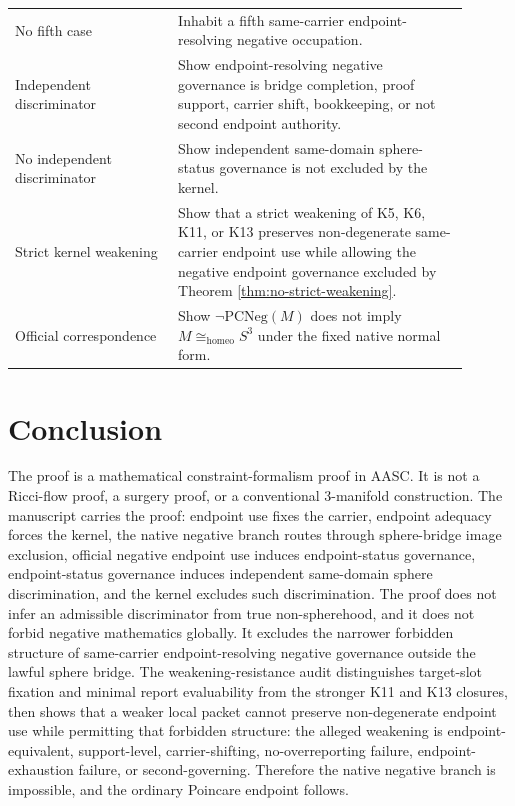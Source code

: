 \documentclass[11pt]{article}
\newcommand{\Sthree}{S^{3}}
\newcommand{\PCNeg}{\mathrm{PCNeg}}
\newcommand{\Homeo}{\cong_{\mathrm{homeo}}}
\begin{document}
\begin{longtable}{L{0.32\linewidth}L{0.58\linewidth}}
No fifth case & Inhabit a fifth same-carrier endpoint-resolving negative occupation.\\
Independent discriminator & Show endpoint-resolving negative governance is bridge completion, proof support, carrier shift, bookkeeping, or not second endpoint authority.\\
No independent discriminator & Show independent same-domain sphere-status governance is not excluded by the kernel.\\
Strict kernel weakening & Show that a strict weakening of K5, K6, K11, or K13 preserves non-degenerate same-carrier endpoint use while allowing the negative endpoint governance excluded by Theorem \ref{thm:no-strict-weakening}.\\
Official correspondence & Show \(\neg\PCNeg(M)\) does not imply \(M\Homeo\Sthree\) under the fixed native normal form.\\
\bottomrule
\end{longtable}

\section{Conclusion}\label{sec:conclusion}

The proof is a mathematical constraint-formalism proof in AASC. It is not a Ricci-flow proof, a surgery proof, or a conventional 3-manifold construction. The manuscript carries the proof: endpoint use fixes the carrier, endpoint adequacy forces the kernel, the native negative branch routes through sphere-bridge image exclusion, official negative endpoint use induces endpoint-status governance, endpoint-status governance induces independent same-domain sphere discrimination, and the kernel excludes such discrimination. The proof does not infer an admissible discriminator from true non-spherehood, and it does not forbid negative mathematics globally. It excludes the narrower forbidden structure of same-carrier endpoint-resolving negative governance outside the lawful sphere bridge. The weakening-resistance audit distinguishes target-slot fixation and minimal report evaluability from the stronger K11 and K13 closures, then shows that a weaker local packet cannot preserve non-degenerate endpoint use while permitting that forbidden structure: the alleged weakening is endpoint-equivalent, support-level, carrier-shifting, no-overreporting failure, endpoint-exhaustion failure, or second-governing. Therefore the native negative branch is impossible, and the ordinary Poincare endpoint follows.
\end{document}
